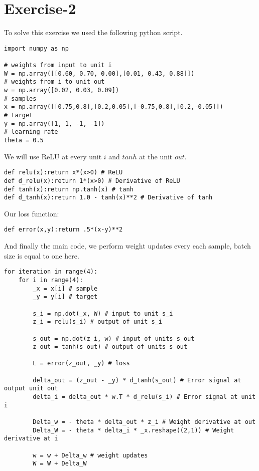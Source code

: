 \documentclass[10pt]{article}
\begin{document}
\section*{Exercise-2}
To solve this exercise we used the following python script.
\begin{small}
\begin{verbatim}
import numpy as np

# weights from input to unit i
W = np.array([[0.60, 0.70, 0.00],[0.01, 0.43, 0.88]])
# weights from i to unit out
w = np.array([0.02, 0.03, 0.09])
# samples
x = np.array([[0.75,0.8],[0.2,0.05],[-0.75,0.8],[0.2,-0.05]])
# target
y = np.array([1, 1, -1, -1])
# learning rate
theta = 0.5
\end{verbatim}
\end{small} 
We will use ReLU at every unit $i$ and $tanh$ at the unit $out$.
\begin{small}
\begin{verbatim}
def relu(x):return x*(x>0) # ReLU
def d_relu(x):return 1*(x>0) # Derivative of ReLU
def tanh(x):return np.tanh(x) # tanh
def d_tanh(x):return 1.0 - tanh(x)**2 # Derivative of tanh
\end{verbatim}
\end{small}
Our loss function:
\begin{small}
\begin{verbatim}
def error(x,y):return .5*(x-y)**2
\end{verbatim}
\end{small}
And finally the main code, we perform weight updates every each sample, batch size is equal to one here.
\begin{small}
\begin{verbatim}
for iteration in range(4):
    for i in range(4):
        _x = x[i] # sample
        _y = y[i] # target
        
        s_i = np.dot(_x, W) # input to unit s_i
        z_i = relu(s_i) # output of unit s_i

        s_out = np.dot(z_i, w) # input of units s_out
        z_out = tanh(s_out) # output of units s_out
        
        L = error(z_out, _y) # loss
        
        delta_out = (z_out - _y) * d_tanh(s_out) # Error signal at output unit out
        delta_i = delta_out * w.T * d_relu(s_i) # Error signal at unit i
        
        Delta_w = - theta * delta_out * z_i # Weight derivative at out
        Delta_W = - theta * delta_i * _x.reshape((2,1)) # Weight derivative at i
        
        w = w + Delta_w # weight updates
        W = W + Delta_W
\end{verbatim}
\end{small}
\end{document}
